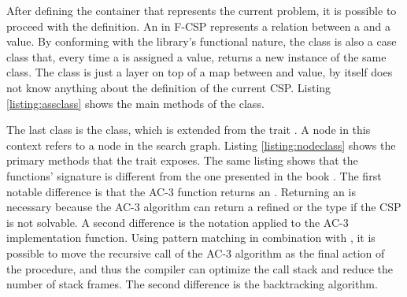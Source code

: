 After defining the container that represents the current problem, it is possible
to proceed with the  definition. An  in
F-CSP represents a relation between a  and a value. By
conforming with the library's functional nature, the  class is
also a case class that, every time a  is assigned a value,
returns a new instance of the same class. The  class is just a
layer on top of a map between  and value, by itself does not
know anything about the definition of the current CSP. Listing
\ref{listing:assclass} shows the main methods of the  class.


The last class is the  class, which is extended from the trait
. A node in this context refers to a node in the search graph.
Listing \ref{listing:nodeclass} shows the primary methods that the trait
 exposes. The same listing shows that the functions' signature is
different from the one presented in the book \cite{russell2002artificial}. The
first notable difference is that the AC-3 function returns an
. Returning an  is necessary because the
AC-3 algorithm can return a refined  or the  type if the
CSP is not solvable. A second difference is the  notation applied
to the AC-3 implementation function. Using pattern matching in combination with
, it is possible to move the recursive call of the AC-3 algorithm
as the final action of the procedure, and thus the compiler can optimize the
call stack and reduce the number of stack frames. The second difference is the
backtracking algorithm.

